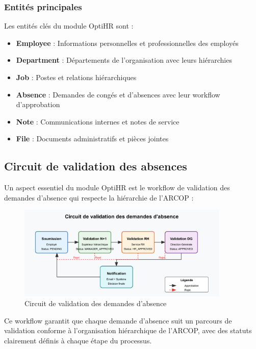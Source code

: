 \subsubsection{Entités principales}
Les entités clés du module OptiHR sont :

\begin{itemize}
    \item \textbf{Employee} : Informations personnelles et professionnelles des employés
    \item \textbf{Department} : Départements de l'organisation avec leurs hiérarchies
    \item \textbf{Job} : Postes et relations hiérarchiques
    \item \textbf{Absence} : Demandes de congés et d'absences avec leur workflow d'approbation
    \item \textbf{Note} : Communications internes et notes de service
    \item \textbf{File} : Documents administratifs et pièces jointes
\end{itemize}

\subsection{Circuit de validation des absences}
Un aspect essentiel du module OptiHR est le workflow de validation des demandes d'absence qui respecte la hiérarchie de l'ARCOP :

\begin{figure}[H]
    \centering
    \includegraphics[width=0.9\textwidth]{images/diagrammes/architecture/workflow-validation-svg.pdf}
    \caption{Circuit de validation des demandes d'absence}
    \label{fig:workflow_validation}
\end{figure}

Ce workflow garantit que chaque demande d'absence suit un parcours de validation conforme à l'organisation hiérarchique de l'ARCOP, avec des statuts clairement définis à chaque étape du processus.

